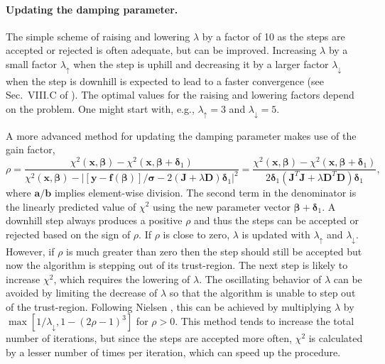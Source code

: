 \documentclass{article}
\begin{document}
\paragraph{Updating the damping parameter.} The simple scheme of raising and lowering $\lambda$ by a factor of 10 as the steps are accepted or rejected is often adequate, but can be improved. Increasing $\lambda$ by a small factor $\lambda_\uparrow$ when the step is uphill and decreasing it by a larger factor $\lambda_\downarrow$ when the step is downhill is expected to lead to a faster convergence (see Sec.~VIII.C of \cite{transtrum11}). The optimal values for the raising and lowering factors depend on the problem. One might start with, e.g., $\lambda_\uparrow=3$ and $\lambda_\downarrow=5$.

A more advanced method for updating the damping parameter makes use of the gain factor,
\begin{equation}
  \label{eq:gain_factor}
  \rho = \frac{\chi^2(\bm x, \bm\beta) - \chi^2(\bm x,
    \bm\beta+\bm\delta_1)}{\chi^2(\bm x, \bm\beta) - \left| [\bm y
      - \bm f(\bm\beta)]/\bm\sigma - 2(\bm J+\lambda\bm
      D)\bm\delta_1 \right|^2} = \frac{\chi^2(\bm x, \bm\beta) -
    \chi^2(\bm x, \bm\beta+\bm\delta_1)}{2\bm\delta_1(\bm J^T\bm
    J+\lambda\bm D^T\bm D)\bm\delta_1},
\end{equation}
where $\bm a/\bm b$ implies element-wise division. The second term in the denominator is the linearly predicted value of $\chi^2$ using the new parameter vector $\bm\beta+\bm\delta_1$. A downhill step always produces a positive $\rho$ and thus the steps can be accepted or rejected based on the sign of $\rho$. If $\rho$ is close to zero, $\lambda$ is updated with $\lambda_\uparrow$ and $\lambda_\downarrow$. However, if $\rho$ is much greater than zero then the step should still be accepted but now the algorithm is stepping out of its trust-region. The next step is likely to increase $\chi^2$, which requires the lowering of $\lambda$. The oscillating behavior of $\lambda$ can be avoided by limiting the decrease of $\lambda$ so that the algorithm is unable to step out of the trust-region. Following Nielsen \cite{nielsen99}, this can be achieved by multiplying $\lambda$ by $\max[1/\lambda_\downarrow,1-(2\rho-1)^3]$ for $\rho>0$. This method tends to increase the total number of iterations, but since the steps are accepted more often, $\chi^2$ is calculated by a lesser number of times per iteration, which can speed up the procedure.
\end{document}
